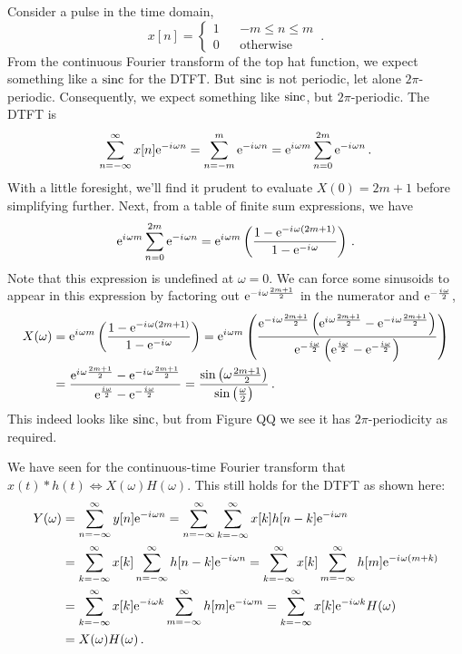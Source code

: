 \begin{exmp}
  Consider a pulse in the time domain,
  \begin{displaymath}
    x[n] = \left\{\begin{array}{ccl}
    1 & & -m \leq n \leq m \\
    0 & & \mathrm{otherwise}
    \end{array}\right. \,.
  \end{displaymath}
  From the continuous Fourier transform of the top hat function, we expect
  something like a $\operatorname{sinc}$ for the DTFT. But $\operatorname{sinc}$ is not periodic, let alone
  $2\pi$-periodic. Consequently, we expect something like $\operatorname{sinc}$, but $2\pi$-periodic.
  The DTFT is
  \begin{displaymath}
    \sum_{n=-\infty}^\infty x[n]\mathrm{e}^{-{i\mkern1mu}\omega n} = \sum_{n=-m}^m \mathrm{e}^{-{i\mkern1mu}\omega n}
    = \mathrm{e}^{{i\mkern1mu}\omega m}\sum_{n=0}^{2m}\mathrm{e}^{-{i\mkern1mu}\omega n} \,.
  \end{displaymath}
  With a little foresight, we'll find it prudent to evaluate
  $X(0) = 2m + 1$ before simplifying further. Next, from a table of finite sum
  expressions, we have
  \begin{displaymath}
    \mathrm{e}^{{i\mkern1mu}\omega m}\sum_{n=0}^{2m}\mathrm{e}^{-{i\mkern1mu}\omega n}
    = \mathrm{e}^{{i\mkern1mu}\omega m}\left(
    \frac{1 - \mathrm{e}^{-{i\mkern1mu}\omega(2m+1)}}{1 - \mathrm{e}^{-{i\mkern1mu}\omega}}
    \right) \,.
  \end{displaymath}
  Note that this expression is undefined at $\omega = 0$. We can force some
  sinusoids to appear in this expression by factoring out $\mathrm{e}^{-{i\mkern1mu}\omega\frac{2m+1}{2}}$
  in the numerator and $\mathrm{e}^{-\frac{{i\mkern1mu}\omega}{2}}$,
  \begin{align*}
    X(\omega) &= \mathrm{e}^{{i\mkern1mu}\omega m}\left(
    \frac{1 - \mathrm{e}^{-{i\mkern1mu}\omega(2m+1)}}{1 - \mathrm{e}^{-{i\mkern1mu}\omega}}
    \right)
    = \mathrm{e}^{{i\mkern1mu}\omega m}\left(
    \frac{\mathrm{e}^{-{i\mkern1mu}\omega\frac{2m+1}{2}}\left(\mathrm{e}^{{i\mkern1mu}\omega\frac{2m+1}{2}}
        - \mathrm{e}^{-{i\mkern1mu}\omega\frac{2m+1}{2}}\right)}{\mathrm{e}^{-\frac{{i\mkern1mu}\omega}{2}}\left(\mathrm{e}^{\frac{{i\mkern1mu}\omega}{2}}
      - \mathrm{e}^{-\frac{{i\mkern1mu}\omega}{2}}\right)}
    \right) \\
    &= 
    \frac{
      \mathrm{e}^{{i\mkern1mu}\omega\frac{2m+1}{2}} - \mathrm{e}^{-{i\mkern1mu}\omega\frac{2m+1}{2}}
    }{
      \mathrm{e}^{\frac{{i\mkern1mu}\omega}{2}} - \mathrm{e}^{-\frac{{i\mkern1mu}\omega}{2}}
    } 
    = \frac{\sin\left(\omega\frac{2m+1}{2}\right)}{\sin\left(\frac{\omega}{2}\right)} \,.
  \end{align*}
  This indeed looks like $\operatorname{sinc}$, but from Figure QQ we see it has
  $2\pi$-periodicity as required.
\end{exmp}
%
We have seen for the continuous-time Fourier transform that
$x(t) * h(t) \Longleftrightarrow X(\omega)H(\omega)$. This still holds for the DTFT
as shown here:
%
\begin{align*}
  Y(\omega) &= \sum_{n=-\infty}^\infty y[n]\mathrm{e}^{-{i\mkern1mu}\omega n} = \sum_{n=-\infty}^\infty\sum_{k=-\infty}^\infty x[k]h[n-k]\mathrm{e}^{-{i\mkern1mu}\omega n} \\
  &= \sum_{k=-\infty}^\infty x[k]\sum_{n=-\infty}^\infty h[n-k]\mathrm{e}^{-{i\mkern1mu}\omega n} = \sum_{k=-\infty}^\infty x[k]\sum_{m=-\infty}^\infty h[m]\mathrm{e}^{-{i\mkern1mu}\omega(m + k)} \\
  &= \sum_{k=-\infty}^\infty x[k]\mathrm{e}^{-{i\mkern1mu}\omega k}\sum_{m=-\infty}^\infty h[m]\mathrm{e}^{-{i\mkern1mu}\omega m} 
  = \sum_{k=-\infty}^\infty x[k]\mathrm{e}^{-{i\mkern1mu}\omega k} H(\omega) \\
  &= X(\omega)H(\omega) \,.
\end{align*}

